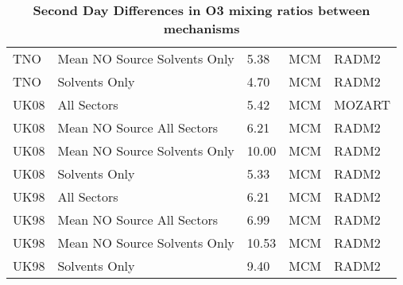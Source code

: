 \documentclass{report}
\begin{document}
\begin{table}
\begin{center}
{\begin{tabular}{lllll}
			TNO & Mean NO Source Solvents Only & 5.38 & MCM & RADM2\\ 
			TNO & Solvents Only & 4.70 & MCM & RADM2\\ 
			\midrule
			UK08 & All Sectors & 5.42 & MCM & MOZART\\ 
			UK08 & Mean NO Source All Sectors & 6.21 & MCM & RADM2\\ 
			UK08 & Mean NO Source Solvents Only & 10.00 & MCM & RADM2\\ 
			UK08 & Solvents Only & 5.33 & MCM & RADM2\\ 
			\midrule
			UK98 & All Sectors & 6.21 & MCM & RADM2\\ 
			UK98 & Mean NO Source All Sectors & 6.99 & MCM & RADM2\\ 
			UK98 & Mean NO Source Solvents Only & 10.53 & MCM & RADM2\\ 
			UK98 & Solvents Only & 9.40 & MCM & RADM2\\ 
			\bottomrule
		\end{tabular}}

		\caption{\textbf{Second Day Differences in O3 mixing ratios between mechanisms}}
		\end{center}
\end{table}
\end{document}
